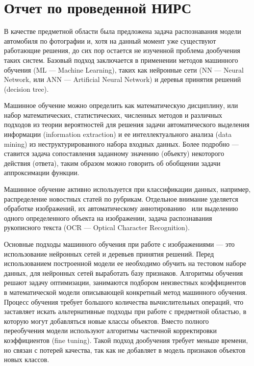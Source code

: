 \documentclass[a4paper,14pt]{extarticle} %
\begin{document}
 
\renewcommand{\figurename}{Рисунок}
\renewcommand{\baselinestretch}{1.5}
\renewcommand{\abstractname}{{Аннотация}}

\section*{\centering Отчет по проведенной НИРС}
\hspace{\parindent} В качестве предметной области была предложена задача распознавания модели автомобиля по фотографии и, хотя на данный момент уже существуют работающие решения, до сих пор остается не изученной проблема дообучения таких систем. Базовый подход заключается в применении методов машинного обучения (ML --- Machine Learning), таких как нейронные сети (NN --- Neural Network, или ANN --- Artificial Neural Network) и деревья принятия решений (decision tree).

Машинное обучение можно определить как математическую дисциплину, или набор математических, статистических, численных методов и различных подходов из теории вероятностей для решения задачи автоматического выделения информации (information extraction) и ее интеллектуального анализа (data mining) из неструктурированного набора входных данных. Более подробно --- ставится задача сопоставления заданному значению (объекту) некоторого действия (ответа), таким образом можно говорить об обобщении задачи аппроксимации функции. 

Машинное обучение активно используется при классификации данных, например, распределение новостных статей по рубрикам. Отдельное внимание уделяется обработке изображений, их автоматическому аннотированию~\cite{farabet2013learning} или выделению одного определенного объекта на изображении,  задача распознавания рукописного текста (OCR --- Optical Character Recognition).

Основные подходы машинного обучения при работе с изображениями --- это использование нейронных сетей и деревьев принятия решений. Перед использованием построенной модели ее необходимо обучить на тестовом наборе данных, для нейронных сетей выработать базу признаков. Алгоритмы обучения решают задачу оптимизации, занимаются подбором неизвестных коэффициентов в математической модели описывающей конкретный метод машинного обучения. Процесс обучения требует большого количества вычислительных операций, что заставляет искать альтернативные подходы при работе с предметной областью, в которую могут добавляться новые классы объектов. Вместо полного переобучения модели используют алгоритмы частичной корректировки коэффициентов (fine tuning). Такой подход дообучения требует меньше времени, но связан с потерей качества, так как не добавляет в модель признаков объектов новых классов.
\end{document}
